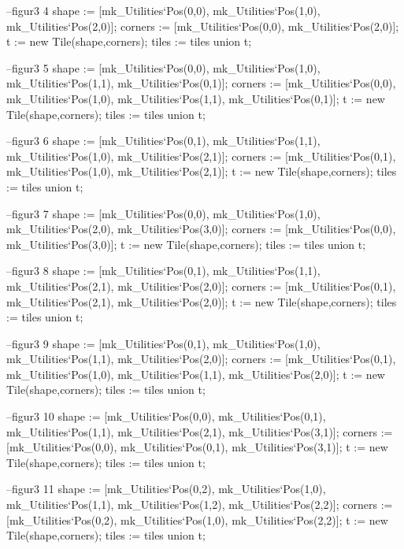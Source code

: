 \begin{vdm_al}
            --figur3 4
            shape := [mk_Utilities`Pos(0,0), mk_Utilities`Pos(1,0), mk_Utilities`Pos(2,0)];
            corners := [mk_Utilities`Pos(0,0), mk_Utilities`Pos(2,0)];
            t := new Tile(shape,corners); 
            tiles := tiles union {t};
            
            --figur3 5
            shape := [mk_Utilities`Pos(0,0), mk_Utilities`Pos(1,0), mk_Utilities`Pos(1,1), mk_Utilities`Pos(0,1)];
            corners := [mk_Utilities`Pos(0,0), mk_Utilities`Pos(1,0), mk_Utilities`Pos(1,1), mk_Utilities`Pos(0,1)];
            t := new Tile(shape,corners); 
            tiles := tiles union {t};
            
            --figur3 6
            shape := [mk_Utilities`Pos(0,1), mk_Utilities`Pos(1,1), mk_Utilities`Pos(1,0), mk_Utilities`Pos(2,1)];
            corners :=  [mk_Utilities`Pos(0,1), mk_Utilities`Pos(1,0), mk_Utilities`Pos(2,1)];
            t := new Tile(shape,corners); 
            tiles := tiles union {t};
            
            --figur3 7
            shape := [mk_Utilities`Pos(0,0), mk_Utilities`Pos(1,0), mk_Utilities`Pos(2,0), mk_Utilities`Pos(3,0)];
            corners :=  [mk_Utilities`Pos(0,0), mk_Utilities`Pos(3,0)];
            t := new Tile(shape,corners); 
            tiles := tiles union {t};
            
            --figur3 8
            shape := [mk_Utilities`Pos(0,1), mk_Utilities`Pos(1,1), mk_Utilities`Pos(2,1), mk_Utilities`Pos(2,0)];
            corners :=  [mk_Utilities`Pos(0,1), mk_Utilities`Pos(2,1), mk_Utilities`Pos(2,0)];
            t := new Tile(shape,corners); 
            tiles := tiles union {t};
            
            --figur3 9
            shape := [mk_Utilities`Pos(0,1), mk_Utilities`Pos(1,0), mk_Utilities`Pos(1,1), mk_Utilities`Pos(2,0)];
            corners := [mk_Utilities`Pos(0,1), mk_Utilities`Pos(1,0), mk_Utilities`Pos(1,1), mk_Utilities`Pos(2,0)];
            t := new Tile(shape,corners); 
            tiles := tiles union {t};
            
            --figur3 10
            shape := [mk_Utilities`Pos(0,0), mk_Utilities`Pos(0,1), mk_Utilities`Pos(1,1), mk_Utilities`Pos(2,1), mk_Utilities`Pos(3,1)];
            corners := [mk_Utilities`Pos(0,0), mk_Utilities`Pos(0,1), mk_Utilities`Pos(3,1)];
            t := new Tile(shape,corners); 
            tiles := tiles union {t};
            
            --figur3 11
            shape := [mk_Utilities`Pos(0,2), mk_Utilities`Pos(1,0), mk_Utilities`Pos(1,1), mk_Utilities`Pos(1,2), mk_Utilities`Pos(2,2)];
            corners := [mk_Utilities`Pos(0,2), mk_Utilities`Pos(1,0), mk_Utilities`Pos(2,2)];
            t := new Tile(shape,corners); 
            tiles := tiles union {t};
            

\end{vdm_al}
